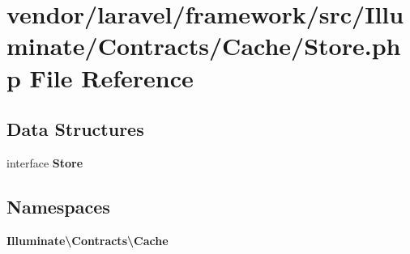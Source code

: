 \section{vendor/laravel/framework/src/\+Illuminate/\+Contracts/\+Cache/\+Store.php File Reference}
\label{laravel_2framework_2src_2_illuminate_2_contracts_2_cache_2_store_8php}
\subsection*{Data Structures}
\begin{DoxyCompactItemize}
\item 
interface {\bf Store}
\end{DoxyCompactItemize}
\subsection*{Namespaces}
\begin{DoxyCompactItemize}
\item 
 {\bf Illuminate\textbackslash{}\+Contracts\textbackslash{}\+Cache}
\end{DoxyCompactItemize}
